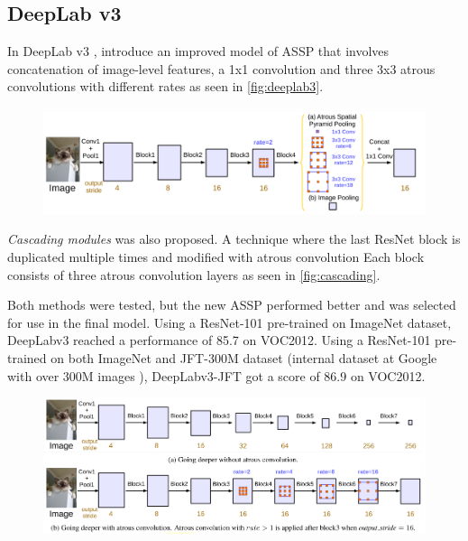 \subsection{DeepLab v3}
In DeepLab v3 ,\citet{Chen2017a} introduce an improved model of ASSP that involves concatenation of image-level features, a 1x1 convolution and three 3x3 atrous convolutions with different rates as seen in \autoref{fig:deeplab3}.

\begin{figure}[H]
    \centering
    \includegraphics[width=0.8\linewidth]{fig/deeplab3.png}
    \label{fig:deeplab3}
\end{figure}

\emph{Cascading modules} was also proposed. A technique where the last ResNet block is duplicated multiple times and modified with atrous convolution Each block consists of three atrous convolution layers as seen in \autoref{fig:cascading}.

Both methods were tested, but the new ASSP performed better and was selected for use in the final model. Using a ResNet-101 pre-trained on ImageNet dataset, DeepLabv3 reached a performance of 85.7 on VOC2012. Using a ResNet-101 pre-trained on both ImageNet and JFT-300M dataset (internal dataset at Google with over 300M images \cite{Hinton2015}\cite{Sun2017}), DeepLabv3-JFT got a score of 86.9 on VOC2012.

\begin{figure}[H]
    \centering
    \includegraphics[width=0.8\linewidth]{fig/cascading.png}
    \label{fig:cascading}
\end{figure}



